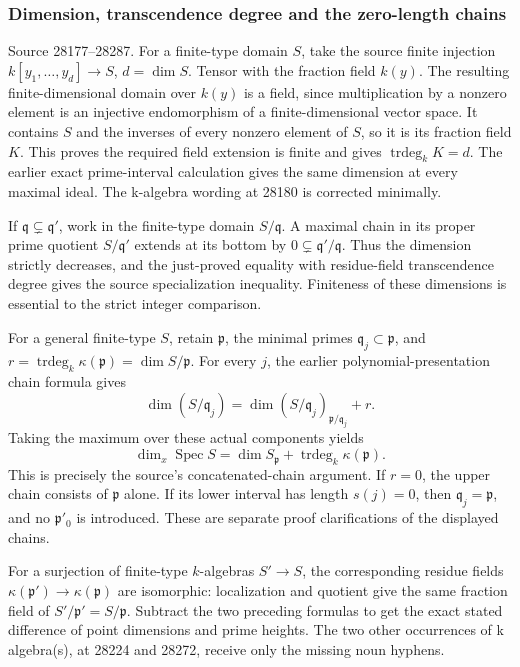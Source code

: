 \subsubsection{Dimension, transcendence degree and the zero-length chains}\label{algebra-proof-026-dimension-transcendence-degree-and-the-zero-length-chains}

Source 28177--28287. For a finite-type domain \(S\), take the source finite injection \(k[y_1,\ldots,y_d]\to S\), \(d=\dim S\). Tensor with the fraction field \(k(y)\). The resulting finite-dimensional domain over \(k(y)\) is a field, since multiplication by a nonzero element is an injective endomorphism of a finite-dimensional vector space. It contains \(S\) and the inverses of every nonzero element of \(S\), so it is its fraction field \(K\). This proves the required field extension is finite and gives \(\operatorname{trdeg}_kK=d\). The earlier exact prime-interval calculation gives the same dimension at every maximal ideal. The k-algebra wording at 28180 is corrected minimally.

If \(\mathfrak q\subsetneq\mathfrak q'\), work in the finite-type domain \(S/\mathfrak q\). A maximal chain in its proper prime quotient \(S/\mathfrak q'\) extends at its bottom by \(0\subsetneq\mathfrak q'/\mathfrak q\). Thus the dimension strictly decreases, and the just-proved equality with residue-field transcendence degree gives the source specialization inequality. Finiteness of these dimensions is essential to the strict integer comparison.

For a general finite-type \(S\), retain \(\mathfrak p\), the minimal primes \(\mathfrak q_j\subset\mathfrak p\), and \(r=\operatorname{trdeg}_k\kappa(\mathfrak p)=\dim S/\mathfrak p\). For every \(j\), the earlier polynomial-presentation chain formula gives \[
 \dim(S/\mathfrak q_j)
   =\dim (S/\mathfrak q_j)_{\mathfrak p/\mathfrak q_j}+r.
\] Taking the maximum over these actual components yields \[
 \dim_x\operatorname{Spec}S
       =\dim S_{\mathfrak p}+\operatorname{trdeg}_k\kappa(\mathfrak p).
\] This is precisely the source's concatenated-chain argument. If \(r=0\), the upper chain consists of \(\mathfrak p\) alone. If its lower interval has length \(s(j)=0\), then \(\mathfrak q_j=\mathfrak p\), and no \(\mathfrak p'_0\) is introduced. These are separate proof clarifications of the displayed chains.

For a surjection of finite-type \(k\)-algebras \(S'\to S\), the corresponding residue fields \(\kappa(\mathfrak p')\to\kappa(\mathfrak p)\) are isomorphic: localization and quotient give the same fraction field of \(S'/\mathfrak p'=S/\mathfrak p\). Subtract the two preceding formulas to get the exact stated difference of point dimensions and prime heights. The two other occurrences of k algebra(s), at 28224 and 28272, receive only the missing noun hyphens.

